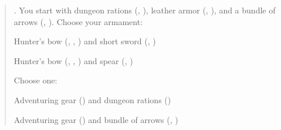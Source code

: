 \documentclass[8pt]{extarticle}
\begin{document}
\begin{multicols}{2}

  \begin{quote}

    . You start with dungeon rations (,
    ), leather armor (, ), and a bundle of
    arrows (, ). Choose your armament:

    \begin{choices}
    \item Hunter’s bow (, , ) and short
      sword (, )
    \item Hunter’s bow (, , ) and spear
      (, )
    \end{choices}

    Choose one:
    \begin{choices}
    \item Adventuring gear () and dungeon rations ()
    \item Adventuring gear () and bundle of arrows
      (, )
    \end{choices}


  \end{quote}

\ 

\columnbreak

\

\end{multicols}

\end{document}
